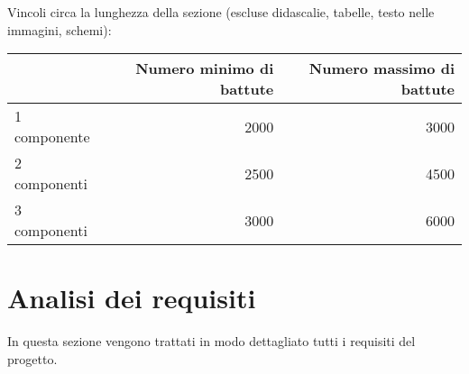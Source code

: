 \documentclass[12pt]{article}
\begin{document}
Vincoli circa la lunghezza della sezione (escluse didascalie, tabelle, testo nelle immagini, schemi):

\vspace{1cm}
\begin{tabular}{l|rr}
 & Numero minimo di battute & Numero massimo di battute \\
 \hline
 1 componente & 2000 & 3000 \\
 2 componenti & 2500 & 4500 \\
 3 componenti & 3000 & 6000 \\
 \hline
\end{tabular}


\newpage



\section{Analisi dei requisiti}

In questa sezione vengono trattati in modo dettagliato tutti i requisiti del progetto.
\end{document}
